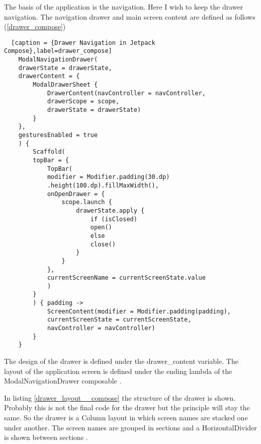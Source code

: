 The basis of the application is the navigation. Here I wish to keep the drawer navigation. 
The navigation drawer and main screen content are defined as follows (\ref{drawer_compose})

\begin{lstlisting}  [caption = {Drawer Navigation in Jetpack Compose},label=drawer_compose]
	ModalNavigationDrawer(
	drawerState = drawerState,
	drawerContent = {
		ModalDrawerSheet {
			DrawerContent(navController = navController,
			drawerScope = scope,
			drawerState = drawerState)
		}
	},
	gesturesEnabled = true
	) {
		Scaffold(
		topBar = {
			TopBar(
			modifier = Modifier.padding(30.dp)
			.height(100.dp).fillMaxWidth(),
			onOpenDrawer = {
				scope.launch {
					drawerState.apply {
						if (isClosed)
						open()
						else
						close()
					}
				}
			},
			currentScreenName = currentScreenState.value
			)
		}
		) { padding ->
			ScreenContent(modifier = Modifier.padding(padding),
			currentScreenState = currentScreenState,
			navController = navController)
		}
	}
\end{lstlisting}

The design of the drawer is defined under the drawer\_content variable. The layout of the application screen is defined under the ending lambda of the ModalNavigationDrawer composable . 

In listing \ref{drawer_layout__compose} the structure of the drawer is shown. Probably this is not the final code for the drawer but the principle will stay the same. So the drawer is a Column layout in which screen names are stacked one under another. The screen names are grouped in sections and a HorizontalDivider is shown between sections .

